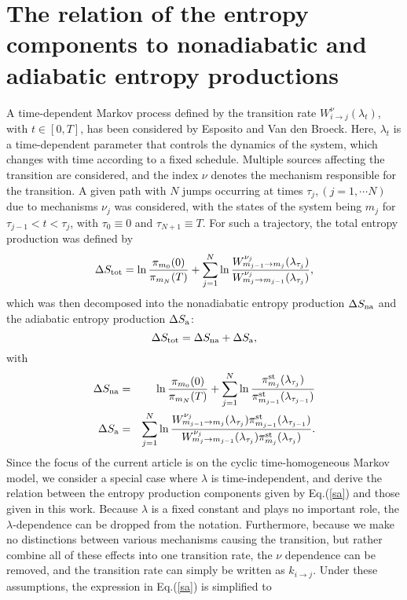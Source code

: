 \documentclass[aps,pre,amsmath,amssymb,floatfix,preprint,nofootinbib]{revtex4}
\begin{document}
\section{The relation of the entropy components to nonadiabatic and adiabatic entropy productions~\cite{episto}}\label{adna}
A time-dependent Markov process defined by the transition rate $W^{\nu}_{i \to j} (\lambda_t)$, with $t \in [0,T]$, has been considered by Esposito and Van den Broeck\cite{episto}. Here, $\lambda_t$ is a time-dependent parameter that controls the dynamics of the system, which changes with time according to a fixed schedule. Multiple sources affecting the transition are considered, and the index $\nu$ denotes the mechanism responsible for the transition. A given path with $N$ jumps occurring at times $\tau_j, (j=1, \cdots N)$ due to mechanisms $\nu_j$ was considered, with the states of the system being $m_j$ for $\tau_{j-1} < t < \tau_{j}$, with $\tau_0 \equiv 0$ and  $\tau_{N+1} \equiv T$. For such a trajectory, the total entropy production was defined by 
\begin{equation}
\Delta S_{\rm tot}= \ln \frac{\pi_{m_0}(0)}{\pi_{m_N}  (T) }
 + \sum_{j=1}^N \ln \frac{ W^{\nu_j}_{m_{j-1} \to m_j}(\lambda_{\tau_j})}{W^{\nu_j}_{m_{j} \to m_{j-1}}(\lambda_{\tau_j})},\label{epitot}
 \end{equation}
which was then decomposed into the nonadiabatic entropy production $\Delta S_{\rm na}$ and the adiabatic entropy production $\Delta S_{\rm a}$: 
\begin{equation}
\Delta S_{\rm tot}= \Delta S_{\rm na} + \Delta S_{\rm a},
\end{equation}
with 
\begin{eqnarray}
\Delta S_{\rm na} &=&  \ln \frac{\pi_{m_0}(0)}{\pi_{m_N} (T)} 
+ \sum_{j=1}^N \ln \frac{\pi^{\rm st}_{m_j}(\lambda_{\tau_j}) }{\pi^{\rm st}_{m_{j-1}}(\lambda_{\tau_{j-1}})} \nonumber\\   
\Delta S_{\rm a} &=& \sum_{j=1}^N \ln  \frac{ W^{\nu_j}_{m_{j-1} \to m_j}(\lambda_{\tau_j}) \pi^{\rm st}_{m_{j-1}} (\lambda_{\tau_{j-1}}) }{W^{\nu_j}_{m_{j} \to m_{j-1}}(\lambda_{\tau_j}) \pi^{\rm st}_{m_j}(\lambda_{\tau_j})}. \label{sa}
\end{eqnarray}
Since the focus of the current article is on the cyclic time-homogeneous Markov model, we consider a special case where $\lambda$ is time-independent, and derive the relation between the entropy production components given by Eq.(\ref{sa}) and those given in this work. Because $\lambda$ is a fixed constant and plays no important role, the $\lambda$-dependence can be dropped from the notation. Furthermore, because we make no distinctions between various mechanisms causing the transition, but rather combine all of these effects into one transition rate, the $\nu$ dependence can be removed, and the transition rate can simply be written as $k_{i \to j}$. Under these assumptions, the expression in Eq.(\ref{sa}) is simplified to
\end{document}
